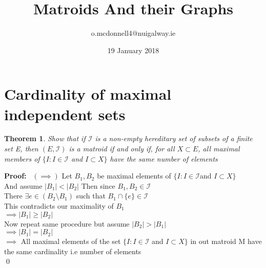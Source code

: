 \documentclass{article}
\title{Matroids And their Graphs}
\author{o.mcdonnell4@nuigalway.ie }
\date{19 January 2018}
\theoremstyle{plain}
\newtheorem{thm}{Theorem}[section]
\theoremstyle{definition}
\theoremstyle{remark}
\newcommand\Proof{%
    \textbf{Proof:}~%
}
\begin{document}
\maketitle
 
 \section{Cardinality of maximal independent sets}
 
 \begin{thm}
 Show that if $\mathcal{I}$ is a non-empty hereditary set of subsets of a finite set E, then $(E,\mathcal{I})$ is a matroid if and only if, for all $X \subset E$, all maximal members of $\{I : I \in \mathcal{I} $ and $ I \subset X\}$ have the same number of elements
 \end{thm}
 
\noindent \Proof $(\implies)$ Let $B_1 , B_2$ be maximal elements of $\{I : I \in \mathcal{I} $and $ I \subset X\}$ \\
\noindent And assume $|B_1| < |B_2|$
Then since $B_1, B_2 \in \mathcal{I}$
\\
There $\exists e \in (B_2 \setminus B_1)$ such that $B_1 \cap \{e\} \in \mathcal{I}$
\\
This contradicts our maximality of $B_1$\\
\noindent $\implies |B_1| \geq |B_2|$
\\
Now repeat same procedure but assume $|B_2| > |B_1|$\\
\noindent $\implies |B_1| = |B_2|$
\\
 \noindent $\implies$ All maximal elements of the set $\{I : I \in \mathcal{I} $ and $ I \subset X\}$ in out matroid M have the same cardinality i.e number of elements
 \\ \qed
 
\end{document}
